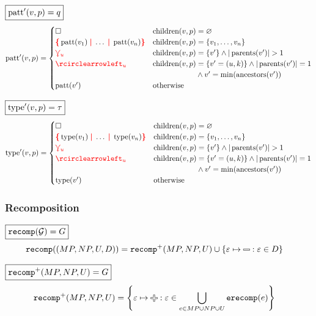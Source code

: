 \noindent $\boxed{\operatorname{\text{patt}}'(v, p) = q}$
%
\begin{align*}
  \patt'(v,p) = \begin{cases}
    \hole & \children(v,p) = \varnothing \\
    \conflictHole{\patt(v_1),\ldots,\patt(v_n)} & \children(v,p) = \SetOf{v_1, \ldots, v_n} \\
    \multiVertex{u} & \children(v,p) = \SetOf{v'} \land |\parents(v')| > 1 \\
    \cycleVertex{u} & \children(v,p) = \SetOf{v'=(u,k)} \land |\parents(v')| = 1 \\
        & \phantom{\children(v,p)} \land v' = \min(\ancestors(v')) \\
    \patt(v') & \text{otherwise} \\
  \end{cases}
\end{align*}

\noindent $\boxed{\operatorname{\text{type}}'(v, p) = \tau}$
%
\begin{align*}
  \type'(v,p) = \begin{cases}
    \hole & \children(v,p) = \varnothing \\
    \conflictHole{\type(v_1),\ldots,\type(v_n)} & \children(v,p) = \SetOf{v_1, \ldots, v_n} \\
    \multiVertex{u} & \children(v,p) = \SetOf{v'} \land |\parents(v')| > 1 \\
    \cycleVertex{u} & \children(v,p) = \SetOf{v' = (u,k)} \land |\parents(v')| = 1 \\
        & \phantom{\children(v,p)} \land v' = \min(\ancestors(v')) \\
    \type(v') & \text{otherwise} \\
  \end{cases}
\end{align*}


\subsubsection{Recomposition}

\noindent $\boxed{\operatorname{\texttt{recomp}}\mathopen{}\left(\mathcal{G}\right)\mathclose{} = G}$
%
\begin{align*}
  \recomp{(MP, NP, U, D)} &= \recompPlus{MP, NP, U} \cup \SetOf{\e \mapsto \Minus \SuchThat{\e \in D}}
\end{align*}

\noindent $\boxed{\operatorname{\texttt{recomp}^{+}}\mathopen{}\left(MP, NP, U\right)\mathclose{} = G}$
%
\begin{align*}
  \recompPlus{MP, NP, U} &= \SetOf{\e \mapsto \Plus \SuchThat{\e \in \bigcup_{e \in MP \cup NP \cup U} \erecomp{e}}}
\end{align*}

